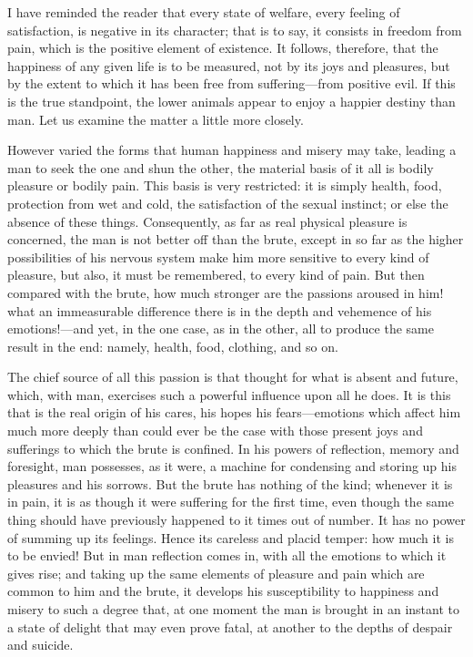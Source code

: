 I have reminded the reader that every state of welfare, every feeling
of satisfaction, is negative in its character; that is to say, it
consists in freedom from pain, which is the positive element of
existence. It follows, therefore, that the happiness of any given life
is to be measured, not by its joys and pleasures, but by the extent to
which it has been free from suffering---from positive evil. If this is
the true standpoint, the lower animals appear to enjoy a happier
destiny than man. Let us examine the matter a little more closely.

However varied the forms that human happiness  and misery may
take, leading a man to seek the one and shun the other, the material
basis of it all is bodily pleasure or bodily pain. This basis is very
restricted: it is simply health, food, protection from wet and cold,
the satisfaction of the sexual instinct; or else the absence of these
things. Consequently, as far as real physical pleasure is concerned,
the man is not better off than the brute, except in so far as the
higher possibilities of his nervous system make him more sensitive to
every kind of pleasure, but also, it must be remembered, to every kind
of pain. But then compared with the brute, how much stronger are the
passions aroused in him! what an immeasurable difference there is in
the depth and vehemence of his emotions!---and yet, in the one case,
as in the other, all to produce the same result in the end: namely,
health, food, clothing, and so on.

The chief source of all this passion is that thought for what is
absent and future, which, with man, exercises such a powerful
influence upon all he does. It is this that is the real origin of his
cares, his hopes his fears---emotions which affect him much more
deeply than could ever be the case with those present joys and
sufferings to which the brute is confined. In his powers of
reflection, memory and foresight, man possesses, as it were, a machine
for condensing and storing up his pleasures and his sorrows. But the
brute has nothing of the kind; whenever it is in pain, it is as though
it were suffering for the first time, even though the same thing
should have previously happened to it times out of number. It has no
power of summing up its feelings. Hence its careless and 
placid temper: how much it is to be envied! But in man reflection
comes in, with all the emotions to which it gives rise; and taking up
the same elements of pleasure and pain which are common to him and the
brute, it develops his susceptibility to happiness and misery to such
a degree that, at one moment the man is brought in an instant to a
state of delight that may even prove fatal, at another to the depths
of despair and suicide.

